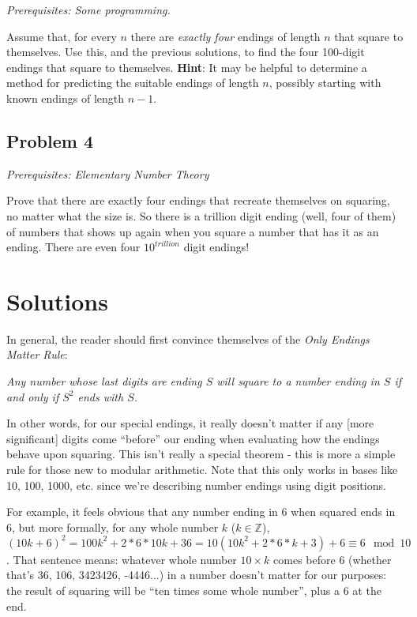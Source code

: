 \documentclass[11pt, oneside]{article} 	%
\begin{document}
\emph{Prerequisites: Some programming.}

Assume that, for every $n$ there are \emph{exactly four} endings of length $n$ that square to themselves.  Use this, and the previous solutions, to find the four 100-digit endings that square to themselves.  \textbf{Hint}: It may be helpful to determine a method for predicting the suitable endings of length $n$, possibly starting with known endings of length $n-1$.

\subsection{Problem 4}

\emph{Prerequisites: Elementary Number Theory}

Prove that there are exactly four endings that recreate themselves on squaring, no matter what the size is.  So there is a trillion digit ending (well, four of them) of numbers that shows up again when you square a number that has it as an ending.  There are even four $10^{trillion}$ digit endings!  



\section{Solutions}

In general, the reader should first convince themselves of the \emph{Only Endings Matter Rule}:


\emph{Any number whose last digits are ending $S$ will square to a number ending in $S$ if and only if $S^2$ ends with $S$.}



 In other words, for our special endings, it really doesn't matter if any [more significant] digits come ``before'' our ending when evaluating how the endings behave upon squaring.   This isn't really a special theorem - this is more a simple rule for those new to modular arithmetic.  Note that this only works in bases like 10, 100, 1000, etc. since we're describing number endings using digit positions.

For example, it feels obvious that any number ending in 6 when squared ends in 6, but more formally, for any whole number $k$ ($k \in \mathbb{Z}$), $(10k + 6)^2 = 100k^2 + 2*6*10k + 36  = 10(10k^2 + 2*6*k + 3) + 6 \equiv 6 \mod 10$. That sentence means: whatever whole number $10 \times k$ comes before $6$ (whether that's 36, 106, 3423426, -4446...) in a number doesn't matter for our purposes: the result of squaring will be ``ten times some whole number'', plus a 6 at the end.
\end{document}
